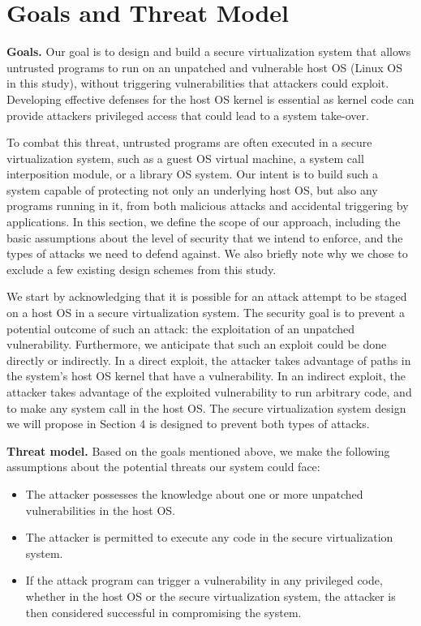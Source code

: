 \section{Goals and Threat Model}
\label{sec.motivation-and-background}

\textbf{Goals.}
Our goal is to design and build a secure virtualization system that allows
untrusted programs to run on an unpatched and vulnerable host OS (Linux OS in
this study), without triggering vulnerabilities that attackers could exploit.
Developing effective defenses for the host OS kernel is essential as kernel code
can provide attackers privileged access that could lead to a system take-over.

To combat this threat, untrusted programs are often executed in a secure
virtualization system, such as a guest OS virtual machine, a system call interposition
module, or a library OS system. Our intent is to
build such a system capable of protecting not only
an underlying host OS, but also any programs running in it, from both malicious attacks
and accidental triggering by applications.
In this section, we define the scope of our approach, including the basic
assumptions about the level of security that we intend to enforce,
and the types of attacks we need to defend against. We also briefly note why we
chose to exclude a few existing design schemes from this study.

We start by acknowledging that it is possible for an attack attempt to be staged
on a host OS in a
secure virtualization system. The security goal is to prevent a potential
outcome of such an attack: the exploitation of an unpatched vulnerability.
Furthermore, we anticipate that such an exploit could be done directly or indirectly.
In a direct exploit, the attacker
takes advantage of paths in the system's host OS kernel
that have a vulnerability. In an indirect exploit,
the attacker takes advantage of the exploited vulnerability to run arbitrary code, and
to make any system call in the host OS.
The secure virtualization system design we will propose
in Section 4 is designed to prevent both types of attacks.

\noindent
\textbf{Threat model.}
Based on the goals mentioned above, we make the following assumptions about the
potential threats our system could face:

\begin{itemize}\setlength\itemsep{0em}

\item The attacker possesses the knowledge about one or more unpatched vulnerabilities in the host OS.

\item The attacker is permitted to execute any code in the secure virtualization system.

\item If the attack program can trigger a vulnerability in any privileged code,
whether in the host OS or the secure virtualization system, the attacker is then considered successful
in compromising the system.

\end{itemize}

